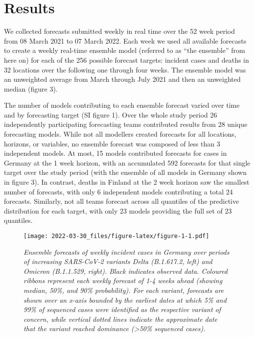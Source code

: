\documentclass[
]{article}
\begin{document}
\hypertarget{results}{%
\section{Results}\label{results}}

We collected forecasts submitted weekly in real time over the 52 week
period from 08 March 2021 to 07 March 2022. Each week we used all
available forecasts to create a weekly real-time ensemble model
(referred to as ``the ensemble'' from here on) for each of the 256
possible forecast targets: incident cases and deaths in 32 locations
over the following one through four weeks. The ensemble model was an
unweighted average from March through July 2021 and then an unweighted
median (figure 3).

The number of models contributing to each ensemble forecast varied over
time and by forecasting target (SI figure 1). Over the whole study
period 26 independently participating forecasting teams contributed
results from 28 unique forecasting models. While not all modellers
created forecasts for all locations, horizons, or variables, no ensemble
forecast was composed of less than 3 independent models. At most, 15
models contributed forecasts for cases in Germany at the 1 week horizon,
with an accumulated 592 forecasts for that single target over the study
period (with the ensemble of all models in Germany shown in figure 3).
In contrast, deaths in Finland at the 2 week horizon saw the smallest
number of forecasts, with only 6 independent models contributing a total
24 forecasts. Similarly, not all teams forecast across all quantiles of
the predictive distribution for each target, with only 23 models
providing the full set of 23 quantiles.

\begin{figure}
\centering
\texttt{[image: 2022-03-30\_files/figure-latex/figure-1-1.pdf]}
\caption{\emph{Ensemble forecasts of weekly incident cases in Germany
over periods of increasing SARS-CoV-2 variants Delta (B.1.617.2, left)
and Omicron (B.1.1.529, right). Black indicates observed data. Coloured
ribbons represent each weekly forecast of 1-4 weeks ahead (showing
median, 50\%, and 90\% probability). For each variant, forecasts are
shown over an x-axis bounded by the earliest dates at which 5\% and 99\%
of sequenced cases were identified as the respective variant of concern,
while vertical dotted lines indicate the approximate date that the
variant reached dominance (\textgreater50\% sequenced cases).}}
\end{figure}
\end{document}
